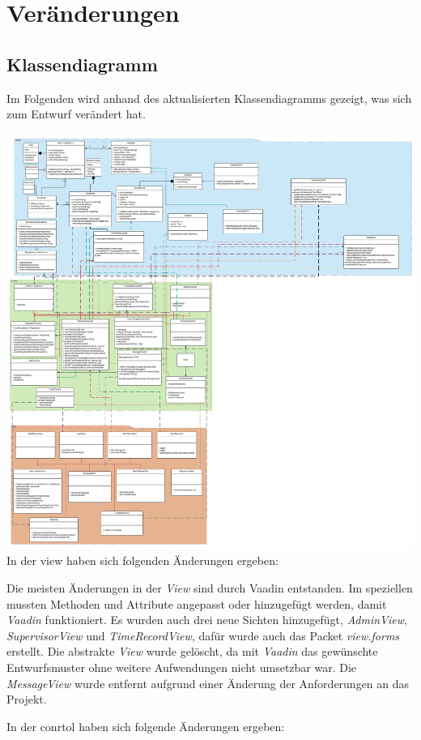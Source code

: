 \section{Veränderungen}
\subsection{Klassendiagramm}
Im Folgenden wird anhand des aktualisierten Klassendiagramms gezeigt, was sich zum Entwurf verändert hat.

\includegraphics{Class Diagramm_alt.svg}
In der view haben sich folgenden Änderungen ergeben:

Die meisten Änderungen in der \emph{View} sind durch Vaadin entstanden. 
Im speziellen mussten Methoden und Attribute angepasst oder hinzugefügt werden, 
damit \emph{Vaadin} funktioniert.
Es wurden auch drei neue Sichten hinzugefügt, \emph{AdminView}, \emph{SupervisorView} und \emph{TimeRecordView}, 
dafür wurde auch das Packet \emph{view.forms} erstellt.
Die abstrakte \emph{View} wurde gelöscht, da mit \emph{Vaadin} das gewünschte Entwurfsmuster 
ohne weitere Aufwendungen nicht umsetzbar war.
Die \emph{MessageView} wurde entfernt aufgrund einer Änderung der Anforderungen an das Projekt.

In der conrtol haben sich folgende Änderungen ergeben:

